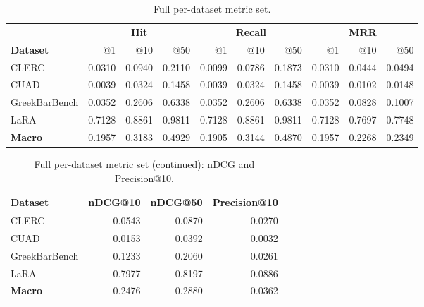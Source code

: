 \documentclass[11pt,a4paper]{article}
\begin{document}
\begin{table}[h]
\centering
\caption{Full per-dataset metric set.}
\small
\begin{tabular}{l r r r r r r r r r}
\toprule
& \multicolumn{3}{c}{\textbf{Hit}} & \multicolumn{3}{c}{\textbf{Recall}}
& \multicolumn{3}{c}{\textbf{MRR}} \\
\cmidrule(lr){2-4}\cmidrule(lr){5-7}\cmidrule(lr){8-10}
\textbf{Dataset} & @1 & @10 & @50 & @1 & @10 & @50 & @1 & @10 & @50 \\
\midrule
CLERC             & \num{0.0310} & \num{0.0940} & \num{0.2110}
                  & \num{0.0099} & \num{0.0786} & \num{0.1873}
                  & \num{0.0310} & \num{0.0444} & \num{0.0494} \\
CUAD              & \num{0.0039} & \num{0.0324} & \num{0.1458}
                  & \num{0.0039} & \num{0.0324} & \num{0.1458}
                  & \num{0.0039} & \num{0.0102} & \num{0.0148} \\
GreekBarBench     & \num{0.0352} & \num{0.2606} & \num{0.6338}
                  & \num{0.0352} & \num{0.2606} & \num{0.6338}
                  & \num{0.0352} & \num{0.0828} & \num{0.1007} \\
LaRA              & \num{0.7128} & \num{0.8861} & \num{0.9811}
                  & \num{0.7128} & \num{0.8861} & \num{0.9811}
                  & \num{0.7128} & \num{0.7697} & \num{0.7748} \\
\midrule
\textbf{Macro}    & \num{0.1957} & \num{0.3183} & \num{0.4929}
                  & \num{0.1905} & \num{0.3144} & \num{0.4870}
                  & \num{0.1957} & \num{0.2268} & \num{0.2349} \\
\bottomrule
\end{tabular}
\end{table}

\begin{table}[h]
\centering
\caption{Full per-dataset metric set (continued): nDCG and
Precision@10.}
\small
\begin{tabular}{l r r r}
\toprule
\textbf{Dataset} & \textbf{nDCG@10} & \textbf{nDCG@50}
  & \textbf{Precision@10} \\
\midrule
CLERC             & \num{0.0543} & \num{0.0870} & \num{0.0270} \\
CUAD              & \num{0.0153} & \num{0.0392} & \num{0.0032} \\
GreekBarBench     & \num{0.1233} & \num{0.2060} & \num{0.0261} \\
LaRA              & \num{0.7977} & \num{0.8197} & \num{0.0886} \\
\midrule
\textbf{Macro}    & \num{0.2476} & \num{0.2880} & \num{0.0362} \\
\bottomrule
\end{tabular}
\end{table}
\end{document}
